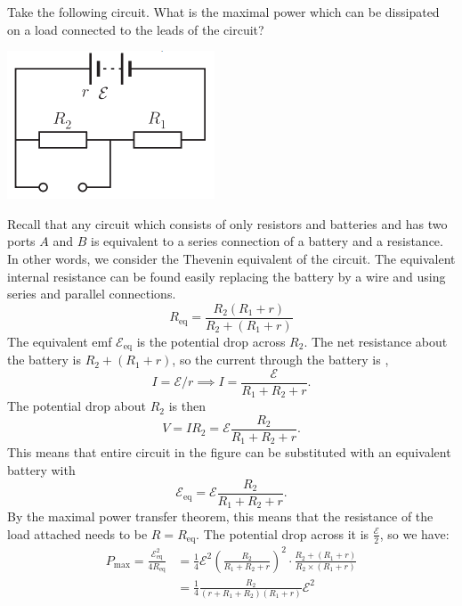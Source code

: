 \documentclass{article}
\begin{document}
\begin{example}
    Take the following circuit. What is the maximal power which can be dissipated on a load connected to the leads of the circuit?
    \begin{center}
        \includegraphics[width=0.3\linewidth]{pr10.png}
    \end{center}
    Recall that any circuit which consists of only resistors and batteries and has two ports $A$ and $B$ is equivalent to a series connection of a battery and a resistance. In other words, we consider the Thevenin equivalent of the circuit. The equivalent internal resistance can be found easily replacing the battery by a wire and using series and parallel connections.
$$R_{\text{eq}} = \frac{R_2(R_1+r)}{R_2 + (R_1+r)}$$The equivalent emf $\mathcal{E}_{\text{eq}}$ is the potential drop across $R_2$. The net resistance about the battery is $R_2 + (R_1+r)$, so the current through the battery is ,
\[ I = \mathcal{E}/r\implies I = \frac{\mathcal{E}}{R_1+R_2+r}.\]The potential drop about $R_2$ is then
\[V = IR_2 = \mathcal{E}\frac{R_2}{R_1+R_2+r}.\]This means that entire circuit in the figure can be substituted with an equivalent battery with
$$\mathcal{E}_{\text{eq}} = \mathcal{E}\frac{R_2}{R_1+R_2+r}.$$By the maximal power transfer theorem, this means that the resistance of the load attached needs to be $R=R_\text{eq}$. The potential drop across it is $\frac{\mathcal{E}}{2}$, so we have: 
\begin{align*}
P_{\text{max}} = \frac{\mathcal{E}_{\text{eq}}^2}{4R_{\text{eq}}} &= \frac{1}{4}\mathcal{E}^2 \left(\frac{R_2}{R_1+R_2+r}\right)^2 \cdot \frac{R_2 + (R_1+r)}{R_2\times (R_1+r)} \\
&= \frac{1}{4}\frac{R_2}{(r + R_1 + R_2)(R_1 + r)}\mathcal{E}^2
\end{align*}
\end{example}
\end{document}
